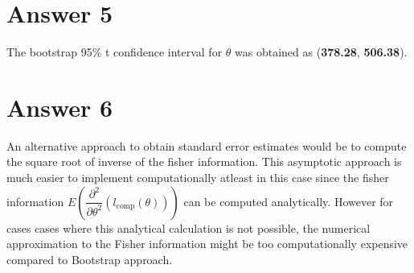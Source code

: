 \documentclass[12pt]{article}
\begin{document}
\section*{Answer 5}
The bootstrap 95\% t confidence interval for $\theta$ was obtained as (\textbf{378.28}, \textbf{506.38}).

\section*{Answer 6}

An alternative approach to obtain standard error estimates would be to compute the square root of inverse of the fisher information. This asymptotic approach is much easier to implement computationally atleast in this case since the fisher information $E\left(\dfrac{\partial^2 }{\partial \theta^2}(l_{\text{comp}}(\theta))\right)$ can be computed analytically. However for cases cases where this analytical calculation is not possible, the numerical approximation to the Fisher information might be too computationally expensive compared to Bootstrap approach.
\end{document}

